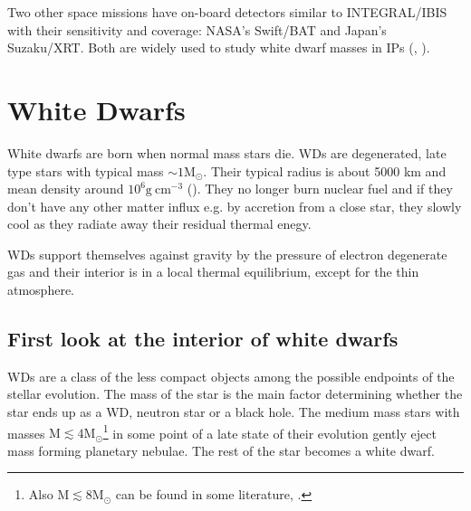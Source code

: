 \documentclass[oneside,a4paper,11pt]{report}
\begin{document}
Two other space missions have on-board detectors similar to INTEGRAL/IBIS with their sensitivity 
and coverage: NASA's Swift/BAT and Japan's Suzaku/XRT. Both are widely used to study white dwarf 
masses in IPs (\citet{2009A&A...496..121B}, \citet{2010A&A...520A..25Y}).    



\chapter{White Dwarfs}
White dwarfs are born when normal mass stars die. WDs are degenerated, late type stars with typical mass $\sim 1 \mathrm{M_{\odot}}$. Their typical radius is about
 5000 km and mean density around $10^6 \mathrm{g\:cm^{-3}}$ (\citet{2004bhwd.book.....S}). They no longer burn nuclear fuel and
if they don't have any other matter influx e.g. by accretion from a close star, they slowly cool as they radiate
away their residual thermal enegy.

WDs support themselves against gravity by the pressure of electron degenerate gas and their interior is in a local thermal 
equilibrium, except for the thin atmosphere.  

\section{First look at the interior of white dwarfs}
WDs are a class of the less compact objects among the possible endpoints of the stellar evolution. 
The mass of the star is the main factor determining whether the star ends up as a WD, neutron star or a black hole.
The medium mass stars with masses $\mathrm{M} \lesssim  4\mathrm{M_{\odot}}$\footnote{Also $\mathrm{M} \lesssim  8\mathrm{M_{\odot}}$ can be found in 
some literature, \citet{padm_vII}.} in some point of a late state of their evolution gently eject mass
 forming planetary nebulae. The rest of the star becomes a white dwarf.  
\end{document}
